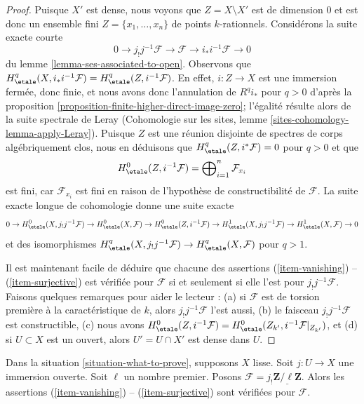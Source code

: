 \begin{proof}
Puisque $X'$ est dense, nous voyons que $Z = X \setminus X'$ est de dimension $0$
et est donc un ensemble fini $Z = \{x_1, \ldots, x_n\}$ de points $k$-rationnels.
Considérons la suite exacte courte
$$
0 \to j_!j^{-1}\mathcal{F} \to \mathcal{F} \to i_*i^{-1}\mathcal{F} \to 0
$$
du lemme \ref{lemma-ses-associated-to-open}. Observons que
$H^q_\etale(X, i_*i^{-1}\mathcal{F}) = H^q_\etale(Z, i^{-1}\mathcal{F})$.
En effet, $i : Z \to X$ est une immersion fermée, donc finie,
et nous avons donc l'annulation de $R^qi_*$ pour $q > 0$ d'après la
proposition \ref{proposition-finite-higher-direct-image-zero};
l'égalité résulte alors de la suite spectrale de Leray
(Cohomologie sur les sites, lemme \ref{sites-cohomology-lemma-apply-Leray}).
Puisque $Z$ est une réunion disjointe de spectres de corps algébriquement
clos, nous en déduisons que $H^q_\etale(Z, i^*\mathcal{F}) = 0$
pour $q > 0$ et que
$$
H^0_\etale(Z, i^{-1}\mathcal{F}) =
\bigoplus\nolimits_{i=1}^n \mathcal{F}_{x_i}
$$
est fini, car $\mathcal{F}_{x_i}$ est fini en raison de
l'hypothèse de constructibilité de $\mathcal{F}$.
La suite exacte longue de cohomologie donne une suite exacte
$$
0 \to
H^0_\etale(X, j_!j^{-1}\mathcal{F}) \to
H^0_\etale(X, \mathcal{F}) \to
H^0_\etale(Z, i^{-1}\mathcal{F}) \to
H^1_\etale(X, j_!j^{-1}\mathcal{F}) \to
H^1_\etale(X, \mathcal{F}) \to 0
$$
et des isomorphismes $H^q_\etale(X, j_!j^{-1}\mathcal{F}) \to
H^q_\etale(X, \mathcal{F})$ pour $q > 1$.

\medskip\noindent
Il est maintenant facile de déduire que chacune des assertions 
(\ref{item-vanishing}) -- (\ref{item-surjective})
est vérifiée pour $\mathcal{F}$ si et seulement si elle l'est pour
$j_!j^{-1}\mathcal{F}$. Faisons quelques remarques pour aider le lecteur :
(a) si $\mathcal{F}$ est de torsion première à la caractéristique
de $k$, alors $j_!j^{-1}\mathcal{F}$ l'est aussi,
(b) le faisceau $j_!j^{-1}\mathcal{F}$ est constructible,
(c) nous avons $H^0_\etale(Z, i^{-1}\mathcal{F}) =
H^0_\etale(Z_{k'}, i^{-1}\mathcal{F}|_{Z_{k'}})$, et (d)
si $U \subset X$ est un ouvert, alors $U' = U \cap X'$ est dense dans $U$.
\end{proof}

\begin{lemma}
\label{lemma-even-easier}
Dans la situation \ref{situation-what-to-prove}, supposons $X$ lisse.
Soit $j : U \to X$ une immersion ouverte. Soit $\ell$ un nombre premier.
Posons $\mathcal{F} = j_!\underline{\mathbf{Z}/\ell\mathbf{Z}}$.
Alors les assertions (\ref{item-vanishing}) -- (\ref{item-surjective}) sont vérifiées
pour $\mathcal{F}$.
\end{lemma}

